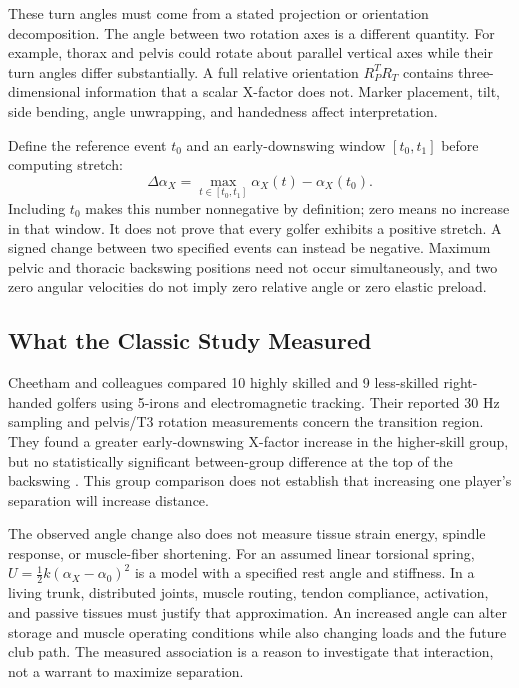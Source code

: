 These turn angles must come from a stated projection or orientation decomposition. The angle between two rotation axes is a different quantity. For example, thorax and pelvis could rotate about parallel vertical axes while their turn angles differ substantially. A full relative orientation $R_P^TR_T$ contains three-dimensional information that a scalar X-factor does not. Marker placement, tilt, side bending, angle unwrapping, and handedness affect interpretation.

Define the reference event $t_0$ and an early-downswing window $[t_0,t_1]$ before computing stretch:
\begin{equation}
\Delta\alpha_X=\max_{t\in[t_0,t_1]}\alpha_X(t)-\alpha_X(t_0).
\end{equation}
Including $t_0$ makes this number nonnegative by definition; zero means no increase in that window. It does not prove that every golfer exhibits a positive stretch. A signed change between two specified events can instead be negative. Maximum pelvic and thoracic backswing positions need not occur simultaneously, and two zero angular velocities do not imply zero relative angle or zero elastic preload.

\subsection{What the Classic Study Measured}
Cheetham and colleagues compared 10 highly skilled and 9 less-skilled right-handed golfers using 5-irons and electromagnetic tracking. Their reported 30 Hz sampling and pelvis/T3 rotation measurements concern the transition region. They found a greater early-downswing X-factor increase in the higher-skill group, but no statistically significant between-group difference at the top of the backswing \citep{Cheetham2001}. This group comparison does not establish that increasing one player's separation will increase distance.

The observed angle change also does not measure tissue strain energy, spindle response, or muscle-fiber shortening. For an assumed linear torsional spring, $U=\tfrac12k(\alpha_X-\alpha_0)^2$ is a model with a specified rest angle and stiffness. In a living trunk, distributed joints, muscle routing, tendon compliance, activation, and passive tissues must justify that approximation. An increased angle can alter storage and muscle operating conditions while also changing loads and the future club path. The measured association is a reason to investigate that interaction, not a warrant to maximize separation.

